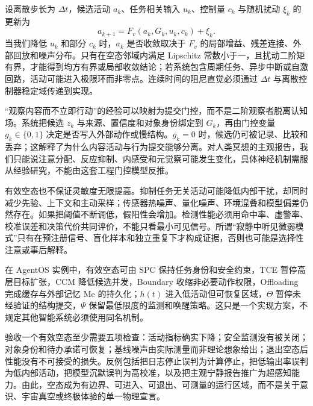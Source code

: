 设离散步长为 $\Delta t$，候选活动 $a_k$、任务相关输入 $u_k$、控制量 $c_k$ 与随机扰动 $\xi_k$ 的更新为
\[
a_{k+1}=F_v(a_k,G_k,u_k,c_k)+\xi_k .
\]
当我们降低 $u_k$ 和部分 $c_k$ 时，$a_k$ 是否收敛取决于 $F_v$ 的局部增益、残差连接、外部回放和噪声分布。只有在空态邻域内满足 Lipschitz 常数小于一，且扰动二阶矩有界，才能得到均方有界或局部收敛结论；若系统包含周期任务、异步中断或自激回路，活动可能进入极限环而非零点。连续时间的阻尼直觉必须通过 $\Delta t$ 与离散控制器稳定域传递到实现。

“观察内容而不立即行动”的经验可以映射为提交门控，而不是二阶观察者脱离认知场。系统把候选 $z_k$ 与来源、置信度和对象身份绑定到 $G_k$，再由门控变量 $g_k\in\{0,1\}$ 决定是否写入外部动作或慢结构。$g_k=0$ 时，候选仍可被记录、比较和丢弃；这解释了为什么内容活动与行为提交能够分离。对人类冥想的主观报告，我们只能说注意分配、反应抑制、内感受和元觉察可能发生变化，具体神经机制需服从经验研究，不能由这套工程门控模型反推。

有效空态也不保证灵敏度无限提高。抑制任务无关活动可能降低内部干扰，却同时减少先验、上下文和主动采样；传感器热噪声、量化噪声、环境混叠和模型偏差仍然存在。如果把阈值不断调低，假阳性会增加。检测性能必须用命中率、虚警率、校准误差和决策代价共同评价，不能只看最小可见信号。所谓“寂静中听见微弱模式”只有在预注册信号、盲化样本和独立重复下才构成证据，否则也可能是选择性注意或事后解释。

在 AgentOS 实例中，有效空态可由 SPC 保持任务身份和安全约束，TCE 暂停高层目标扩张，CCM 降低候选并发，Boundary 收缩非必要动作权限，Offloading 完成缓存与外部记忆 $\mathrm{Me}$ 的持久化；$h(t)$ 进入低活动但可恢复区域，$\Theta$ 暂停未经验证的结构提交，$\Psi$ 保留最低限度的监测和唤醒策略。这只是一个实现方案，不规定其他智能系统必须使用同名机制。

验收一个有效空态至少需要五项检查：活动指标确实下降；安全监测没有被关闭；对象身份和待办承诺可恢复；基线噪声由实际测量而非理论想象给出；退出空态后性能没有不可接受的损失。反例包括把日志停止误判为计算停止，把低输出率误判为低内部活动，把模型沉默误判为高校准，以及把主观宁静报告推广为超感知能力。由此，空态成为有边界、可进入、可退出、可测量的运行区域，而不是关于意识、宇宙真空或终极体验的单一物理宣言。
